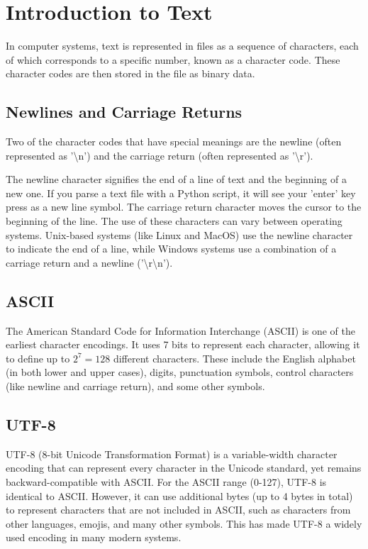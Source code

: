 \chapter{Introduction to Text}


In computer systems, text is represented in files as a sequence of
characters, each of which corresponds to a specific number, known as a
character code. These character codes are then stored in the file as
binary data.

\section{Newlines and Carriage Returns}

Two of the character codes that have special meanings are the newline
(often represented as '\textbackslash n') and the carriage return
(often represented as '\textbackslash r').

The newline character signifies the end of a line of text and the
beginning of a new one. If you parse a text file with a Python script, it will see your 'enter' key press as a new line symbol. 
The carriage return character moves the cursor
to the beginning of the line. The use of these characters can vary
between operating systems. Unix-based systems (like Linux and MacOS)
use the newline character to indicate the end of a line, while Windows
systems use a combination of a carriage return and a newline
('\textbackslash r\textbackslash n').
\section{ASCII}

The American Standard Code for Information Interchange (ASCII) is one
of the earliest character encodings. It uses 7 bits to represent each
character, allowing it to define up to $2^7 = 128$ different
characters. These include the English alphabet (in both lower and
upper cases), digits, punctuation symbols, control characters (like
newline and carriage return), and some other symbols.
\section{UTF-8}
UTF-8 (8-bit Unicode Transformation Format) is a variable-width
character encoding that can represent every character in the Unicode
standard, yet remains backward-compatible with ASCII. For the ASCII
range (0-127), UTF-8 is identical to ASCII. However, it can use additional
bytes (up to 4 bytes in total) to represent characters that are not
included in ASCII, such as characters from other languages, emojis,
and many other symbols. This has made UTF-8 a widely used encoding in
many modern systems.
